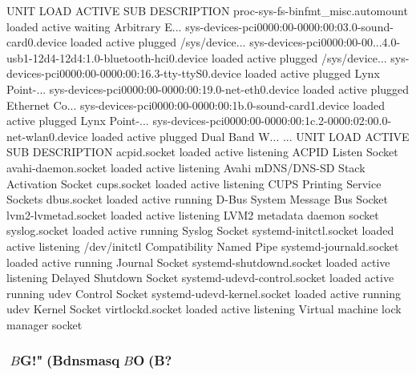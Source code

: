 \documentclass[mingoth,a4paper]{jsarticle}
\begin{document}
\begin{commandline}
UNIT                                                                         LOAD   ACTIVE SUB       DESCRIPTION
proc-sys-fs-binfmt_misc.automount                                            loaded active waiting   Arbitrary E...
sys-devices-pci0000:00-0000:00:03.0-sound-card0.device                       loaded active plugged   /sys/device...
sys-devices-pci0000:00-00...4.0-usb1-1\x2d4-1\x2d4:1.0-bluetooth-hci0.device loaded active plugged   /sys/device...
sys-devices-pci0000:00-0000:00:16.3-tty-ttyS0.device                         loaded active plugged   Lynx Point-...
sys-devices-pci0000:00-0000:00:19.0-net-eth0.device                          loaded active plugged   Ethernet Co...
sys-devices-pci0000:00-0000:00:1b.0-sound-card1.device                       loaded active plugged   Lynx Point-...
sys-devices-pci0000:00-0000:00:1c.2-0000:02:00.0-net-wlan0.device            loaded active plugged   Dual Band W...
...
UNIT                         LOAD   ACTIVE SUB       DESCRIPTION
acpid.socket                 loaded active listening ACPID Listen Socket
avahi-daemon.socket          loaded active listening Avahi mDNS/DNS-SD Stack Activation Socket
cups.socket                  loaded active listening CUPS Printing Service Sockets
dbus.socket                  loaded active running   D-Bus System Message Bus Socket
lvm2-lvmetad.socket          loaded active listening LVM2 metadata daemon socket
syslog.socket                loaded active running   Syslog Socket
systemd-initctl.socket       loaded active listening /dev/initctl Compatibility Named Pipe
systemd-journald.socket      loaded active running   Journal Socket
systemd-shutdownd.socket     loaded active listening Delayed Shutdown Socket
systemd-udevd-control.socket loaded active running   udev Control Socket
systemd-udevd-kernel.socket  loaded active running   udev Kernel Socket
virtlockd.socket             loaded active listening Virtual machine lock manager socket
\end{commandline}

\subsubsection{$B$G!"(Bdnsmasq$B$O(B?}
\end{document}
